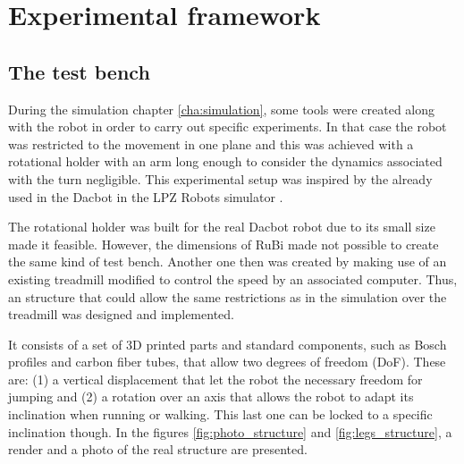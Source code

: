 \chapter{Experimental framework} %
\label{cha:experiments}

\section{The test bench} %
\label{sec:the_test_bench}
During the simulation chapter \ref{cha:simulation}, some tools were created along with the robot in order to carry out specific experiments.
In that case the robot was restricted to the movement in one plane and this was achieved with a rotational holder with an arm long enough to consider the dynamics associated with the turn negligible.
This experimental setup was inspired by the already used in the Dacbot \cite{dacbot1} in the LPZ Robots simulator \cite{lpzrobots}.

The rotational holder was built for the real Dacbot robot due to its small size made it feasible.
However, the dimensions of RuBi made not possible to create the same kind of test bench.
Another one then was created by making use of an existing treadmill modified to control the speed by an associated computer.
Thus, an structure that could allow the same restrictions as in the simulation over the treadmill was designed and implemented.

It consists of a set of 3D printed parts and standard components, such as Bosch profiles and carbon fiber tubes, that allow two degrees of freedom (DoF).
These are: (1) a vertical displacement that let the robot the necessary freedom for jumping and (2) a rotation over an axis that allows the robot to adapt its inclination when running or walking. 
This last one can be locked to a specific inclination though. In the figures \ref{fig:photo_structure} and \ref{fig:legs_structure}, a render and a photo of the real structure are presented.

